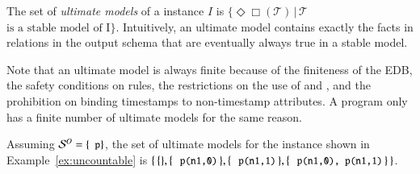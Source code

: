 The set of {\em ultimate models} of a \lang instance $I$ is
$\{\Diamond\Box(\mathcal{T}) \, | \, \mathcal{T}$ $\text{is a stable model of
  I}\}$.  Intuitively, an ultimate model contains exactly the facts in relations
in the output schema that are eventually always true in a stable model.

Note that an ultimate model is always finite because of the finiteness of the EDB, the safety conditions on rules, the restrictions on the use of  and , and the prohibition on binding timestamps to non-timestamp attributes.  A \lang program only has a finite number of ultimate models for the same reason.

\begin{example}
Assuming $\oschema = \{\dedalus{p}\}$, the set of ultimate models for the \lang instance shown in Example~\ref{ex:uncountable} is \linebreak $\{ \, \{\}, \{ \, \dedalus{p(n1,0)} \, \}, \{ \, \dedalus{p(n1,1)} \, \}, \{ \, \dedalus{p(n1,0), p(n1,1)} \, \} \, \}$.
\end{example}




